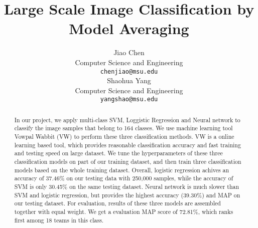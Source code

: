 \documentclass[11pt]{article}
\title{Large Scale Image Classification by Model Averaging}
\author{Jiao Chen \\
  Computer Science and Engineering\\
  {\tt chenjiao@msu.edu} \\\And
  Shaohua Yang\\
  Computer Science and Engineering\\
  {\tt yangshao@msu.edu} \\}
\date{}
\begin{document}
\maketitle
\begin{abstract}
In our project, we apply multi-class SVM, Loggistic Regression and Neural network to classify the image samples that belong to 164 classes. We use machine learning tool Vowpal Wabbit (VW) to perform these three classification methods. VW is a online learning based tool, which provides reasonable classification accuracy and fast training and testing speed on large dataset. We tune the hyperparameters of these three classification models on part of our training dataset, and then train three classification models based on the whole training dataset. Overall, logistic regression achives an accuracy of 37.46\% on our testing data with 250,000 samples, while the accuracy of SVM is only 30.45\% on the same testing dataset. Neural network is much slower than SVM and logistic regression, but provides the highest accuracy (39.30\%) and MAP on our testing dataset. For evaluation, results of these three models are assembled together with equal weight. We get a evaluation MAP score of 72.81\%, which ranks first among 18 teams in this class.   
\end{abstract}


%
%
%


%
%


\clearpage
{\small


}
\end{document}
